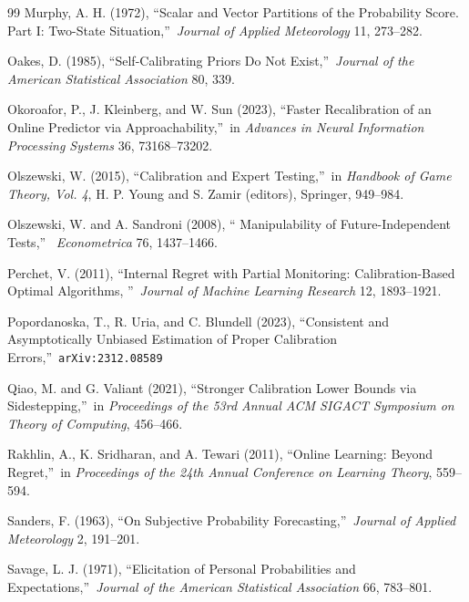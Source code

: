 \documentclass[12pt,a4paper,notitlepage]{article}
\begin{document}
\begin{thebibliography}{99}
\bibitem{} Murphy, A. H. (1972), \textquotedblleft Scalar and Vector
Partitions of the Probability Score. Part I: Two-State
Situation,\textquotedblright\ \emph{Journal of Applied Meteorology} 11,
273--282.

\bibitem{} Oakes, D. (1985), \textquotedblleft Self-Calibrating Priors Do
Not Exist,\textquotedblright\ \emph{Journal of the American Statistical
Association} 80, 339.

\bibitem{} Okoroafor, P., J. Kleinberg, and W. Sun (2023),
\textquotedblleft Faster Recalibration of an Online Predictor via
Approachability,\textquotedblright\ in \emph{Advances in Neural
Information Processing Systems} 36, 73168--73202.

\bibitem{} Olszewski, W. (2015), \textquotedblleft Calibration and Expert
Testing,\textquotedblright\ in \emph{Handbook of Game Theory, Vol. 4}, H. P.
Young and S. Zamir (editors), Springer, 949--984.

\bibitem{} Olszewski, W. and A. Sandroni (2008), \textquotedblleft
Manipulability of Future-Independent Tests,\textquotedblright\ \emph{%
Econometrica} 76, 1437--1466.

\bibitem{} Perchet, V. (2011), \textquotedblleft Internal Regret with
Partial Monitoring: Calibration-Based Optimal Algorithms,
\textquotedblright\ \emph{Journal of Machine Learning Research} 12,
1893--1921.

\bibitem{} Popordanoska, T., R. Uria, and C. Blundell (2023),
\textquotedblleft Consistent and Asymptotically Unbiased Estimation of
Proper Calibration Errors,\textquotedblright\ \texttt{arXiv:2312.08589}

\bibitem{} Qiao, M. and G. Valiant (2021), \textquotedblleft Stronger
Calibration Lower Bounds via Sidestepping,\textquotedblright\ in \emph{%
Proceedings of the 53rd Annual ACM SIGACT Symposium on Theory of
Computing}, 456--466.

\bibitem{} Rakhlin, A., K. Sridharan, and A. Tewari (2011),
\textquotedblleft Online Learning: Beyond Regret,\textquotedblright\ in
\emph{Proceedings of the 24th Annual Conference on Learning Theory},
559--594.

\bibitem{} Sanders, F. (1963), \textquotedblleft On Subjective Probability
Forecasting,\textquotedblright\ \emph{Journal of Applied Meteorology} 2,
191--201.

\bibitem{} Savage, L. J. (1971), \textquotedblleft Elicitation of Personal
Probabilities and Expectations,\textquotedblright\ \emph{Journal of the
American Statistical Association} 66, 783--801.


\end{thebibliography}
\end{document}

